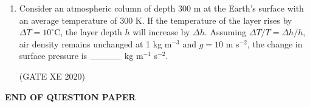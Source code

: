 \documentclass[12pt]{article}
\begin{document}
\begin{enumerate}
(GATE XE 2020)

\item Consider an atmospheric column of depth 300 m at the Earth's surface with an average temperature of 300 K. If the temperature of the layer rises by $\Delta T = 10^\circ$C, the layer depth $h$ will increase by $\Delta h$. Assuming $\Delta T / T = \Delta h / h$, air density remains unchanged at 1 kg m$^{-3}$ and $g = 10$ m s$^{-2}$, the change in surface pressure is \_\_\_\_\_ kg m$^{-1}$ s$^{-2}$.  

(GATE XE 2020)

\end{enumerate}

\begin{center}
    {\Large \textbf{END OF QUESTION PAPER}}
\end{center}
\end{document}
